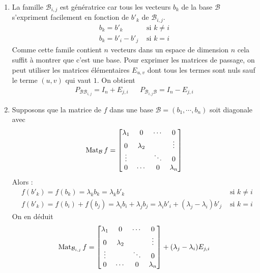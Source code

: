 \begin{enumerate}
 \item La famille $\mathcal B_{i,j}$ est génératrice car tous les vecteurs $b_k$ de la base $\mathcal B$ s'expriment facilement en fonction de $b'_k$ de $\mathcal B_{i,j}$.
\begin{align*}
 b_k = b'_k &\text{ si } k\neq i \\
 b_k = b'_i - b'_j &\text{ si } k=i
\end{align*}
Comme cette famile contient $n$ vecteurs dans un espace de dimension $n$ cela suffit à montrer que c'est une base.\newline
Pour exprimer les matrices de passage, on peut utiliser les matrices élémentaires $E_{u,v}$ dont tous les termes sont nuls sauf le terme $(u,v)$ qui vaut $1$. On obtient
\begin{align*}
 P_{\mathcal B \mathcal B_{i,j}} = I_n + E_{j,i} & &
P_{\mathcal B_{i,j} \mathcal B } = I_n - E_{j,i}
\end{align*}
\item Supposons que la matrice de $f$ dans une base $\mathcal B=(b_1,\cdots,b_n)$ soit diagonale avec
\begin{displaymath}
 \operatorname{Mat}_{\mathcal B}f = 
\begin{bmatrix}
 \lambda_1 &0 &\cdots & 0 \\
0& \lambda_2 & &\vdots \\
\vdots & & \ddots & 0\\
0 &\cdots &0 & \lambda_n
\end{bmatrix}
\end{displaymath}
Alors :
\begin{align*}
 &f(b'_k) = f(b_k)=\lambda_k b_k=\lambda_k b'_k &\text{ si } k\neq i \\
 &f(b'_k) = f(b_i) + f(b_j)=\lambda_ib_i +\lambda_jb_j
=\lambda_ib'_i+(\lambda_j - \lambda_i)b'_j &\text{ si } k=i
\end{align*}
On en déduit
\begin{displaymath}
 \operatorname{Mat}_{\mathcal B_{i,j}} f =
\begin{bmatrix}
 \lambda_1 &0 &\cdots & 0 \\
0& \lambda_2 & &\vdots \\
\vdots & & \ddots & 0\\
0 &\cdots &0 & \lambda_n
\end{bmatrix}
+ (\lambda_j - \lambda_i)E_{j,i}
\end{displaymath}


\end{enumerate}
